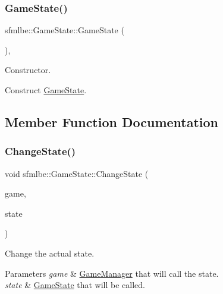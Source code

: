 \subsubsection{\texorpdfstring{Game\+State()}{GameState()}}
{\footnotesize\ttfamily sfmlbe\+::\+Game\+State\+::\+Game\+State (\begin{DoxyParamCaption}{ }\end{DoxyParamCaption})\hspace{0.3cm}{\ttfamily [inline]}, {\ttfamily [protected]}}



Constructor. 

Construct \mbox{\hyperlink{classsfmlbe_1_1_game_state}{Game\+State}}. 

\subsection{Member Function Documentation}
\mbox{\label{classsfmlbe_1_1_game_state_abb4f5e979d3c3fa56de67b302c3ac4b7}} 
\subsubsection{\texorpdfstring{Change\+State()}{ChangeState()}}
{\footnotesize\ttfamily void sfmlbe\+::\+Game\+State\+::\+Change\+State (\begin{DoxyParamCaption}\item[{\mbox{\hyperlink{classsfmlbe_1_1_game_manager}{Game\+Manager}} $\ast$}]{game,  }\item[{\mbox{\hyperlink{classsfmlbe_1_1_game_state}{Game\+State}} $\ast$}]{state }\end{DoxyParamCaption})\hspace{0.3cm}{\ttfamily [inline]}}



Change the actual state. 


\begin{DoxyParams}{Parameters}
{\em game} & \mbox{\hyperlink{classsfmlbe_1_1_game_manager}{Game\+Manager}} that will call the state. \\
\hline
{\em state} & \mbox{\hyperlink{classsfmlbe_1_1_game_state}{Game\+State}} that will be called. \\
\hline
\end{DoxyParams}
\mbox{\label{classsfmlbe_1_1_game_state_ab8f53722c3d8c87d9ca3826b89f1da9b}} 
